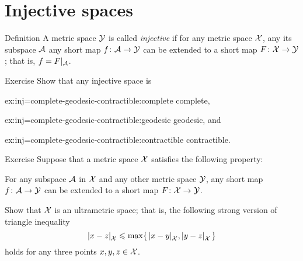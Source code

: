 \section{Injective spaces}

\begin{thm}{Definition}\label{def:injective}
A metric space $\mathcal{Y}$ is called \emph{injective} if for any metric space $\mathcal{X}$,
any its subspace $\mathcal{A}$
any short map $f\colon\mathcal{A}\to \mathcal{Y}$ can be extended to a short map $F\colon\mathcal{X}\to \mathcal{Y}$;
that is, $f=F|_{\mathcal{A}}$.
\end{thm}

\begin{thm}{Exercise}\label{ex:inj=complete-geodesic-contractible}
Show that any injective space is 

\begin{subthm}{ex:inj=complete-geodesic-contractible:complete}
complete,
\end{subthm}

\begin{subthm}{ex:inj=complete-geodesic-contractible:geodesic}
geodesic, and
\end{subthm}

\begin{subthm}{ex:inj=complete-geodesic-contractible:contractible}
contractible.
\end{subthm}
\end{thm}


\begin{thm}{Exercise}\label{ex:ultrametric}
Suppose that a metric space $\mathcal{X}$ satisfies the following property:

For any subspace $\mathcal{A}$ in $\mathcal{X}$ and any other metric space $\mathcal{Y}$, any short map $f\colon\mathcal{A}\to \mathcal{Y}$ can be extended to a short map $F\colon\mathcal{X}\to \mathcal{Y}$.

Show that $\mathcal{X}$ is an ultrametric space;
that is, the following strong version of triangle inequality
\[\dist{x}{z}{\spc{X}}
\le
\max\{\,\dist{x}{y}{\spc{X}},\dist{y}{z}{\spc{X}}\,\}\]
holds for any three points $x,y,z\in \mathcal{X}$.
\end{thm}

